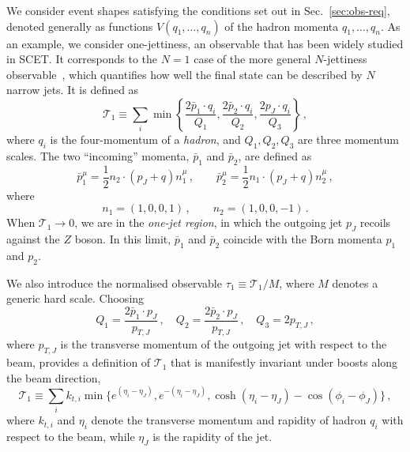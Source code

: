 We consider event shapes satisfying the conditions set out in
Sec.~\ref{sec:obs-req}, denoted generally as functions $V(q_1,\dots,q_n)$ of the
hadron momenta $q_1,\dots,q_n$.
As an example, we consider
one-jettiness, an observable that has been widely studied in SCET.  It corresponds to the 
$N=1$ case of the more general $N$-jettiness observable~\cite{Stewart:2010tn}, 
which quantifies how well the final state can be described by $N$ narrow jets. It is
defined as
\begin{equation}
 \label{eq:T1}
 \mathcal{T}_1\equiv \sum_{i} \min\left\{\frac{2 \bar{p}_1\cdot q_i}{Q_1}, \frac{2 \bar{p}_2\cdot q_i}{Q_2}, \frac{2 p_J \cdot q_i}{Q_3}\right\}\,,
\end{equation}
where $q_i$ is the four-momentum of a \emph{hadron}, and
$Q_1, Q_2, Q_3$ are three momentum scales. The two ``incoming'' momenta, 
$\bar p_1$ and $\bar p_2$, are defined as 
\begin{equation}
	\bar{p}_1^\mu=\frac{1}{2}n_2\cdot (p_J+q)n_1^{\mu}\,,\quad\quad
	\bar{p}_2^\mu=\frac{1}{2}n_1\cdot (p_J+q)n_2^{\mu}\,,
\end{equation}
where
\begin{equation}
  \label{eq:ni-incoming}
  n_1 = (1,0,0,1)\,,\qquad n_2 = (1,0,0,-1)\,.
\end{equation}
When $\mathcal{T}_1\to 0$, we are in the \emph{one-jet region}, in which
the outgoing jet $p_J$ recoils against the $Z$ boson. In this limit,
$\bar p_1$ and $\bar p_2$ coincide with the Born momenta $p_1$ and
$p_2$.

We also introduce the normalised observable
$\tau_1\equiv \mathcal{T}_1/M$, where $M$ denotes a generic hard scale. 
Choosing
\begin{equation}
  \label{eq:Qi-inv}
  Q_1 = \frac{2 \bar{p}_1\cdot p_J}{p_{T,J}}\,,  \quad Q_2 = \frac{2 \bar{p}_2\cdot p_J}{p_{T,J}}\,,
  \quad Q_3 = 2 p_{T,J}\,,
\end{equation}
where $p_{T,J}$ is the transverse momentum of the outgoing jet with
respect to the beam, provides a definition of $\mathcal{T}_1$ that is
manifestly invariant under boosts along the beam direction,
\begin{equation}
	\label{eq:T1-binv}
	\mathcal{T}_1\equiv  \sum_{i} k_{t,i}\min\{e^{(\eta_i-\eta_J)}, e^{-(\eta_i-\eta_J)}, \cosh(\eta_{i}-\eta_J)-\cos(\phi_{i}-\phi_J)\}\,,
\end{equation}
where $k_{t,i}$ and $\eta_i$ denote the transverse momentum and rapidity
of hadron $q_i$ with respect to the beam, while $\eta_J$ is the rapidity of the jet. 

